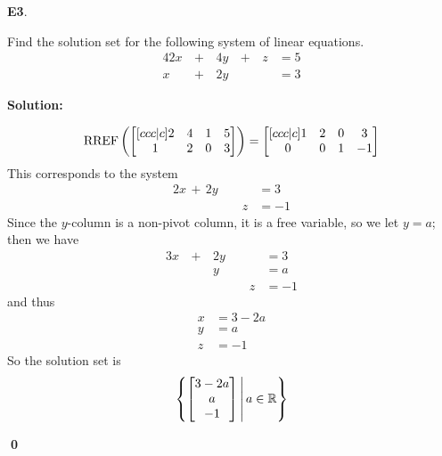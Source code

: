 \documentclass{article}
\newenvironment{problem}[1]
{
	\begin{flushleft}
	\textbf{#1}.
	\ignorespaces
}
{
	\end{flushleft}
}
\newenvironment{solution}
{
	\ignorespaces
	\textbf{Solution:}
}
{
	\ignorespacesafterend
	\begin{flushright}
	{\bfseries \qed}
	\end{flushright}
}
\begin{document}
\begin{problem}{E3}
Find the solution set for the following system of linear equations.
\begin{alignat*}{4}
2x&\,+\,&4y&\,+\,&z &= 5 \\
x&\,+\,&2y &\,\,& &= 3
\end{alignat*}
\end{problem}
\begin{solution}
\[
  \operatorname{RREF} \left(
		\begin{bmatrix}[ccc|c] 2 & 4 & 1 & 5 \\ 1 & 2 & 0 & 3 \end{bmatrix}
	\right)
		=
  \begin{bmatrix}[ccc|c] 1 & 2 & 0 & 3 \\ 0 & 0 & 1 & -1\end{bmatrix}
\]
This corresponds to the system
\begin{alignat*}{2}
x\,+\,2y&\,\,&  &= 3 \\
  &\,\,& z&= -1
\end{alignat*}
Since the $y$-column is a non-pivot column, it is a free variable, so we let $y=a$; then we have
\begin{alignat*}{3}
x&\,+\,&2y&\,\,&  &= 3 \\
 &\,\,&y &\,\,& &=a \\
 &\,\,& &\,\,& z&= -1
\end{alignat*}
and thus
\begin{align*}
x&= 3-2a \\
y&= a \\
z&= -1
\end{align*}
So the solution set is
\[
  \left\{
		\begin{bmatrix} 3-2a \\ a \\ -1 \end{bmatrix}
	\,\middle|\,
		a \in \mathbb{R}
	\right\}
\]
\end{solution}
\end{document}
